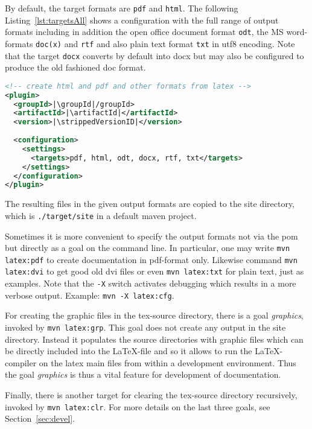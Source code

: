 By default, the target formats are \texttt{pdf} and \texttt{html}. 
The following Listing~\ref{lst:targetsAll} shows a configuration 
with the full range of output formats including in addition 
the open office document format \texttt{odt}, 
the MS word-formats \texttt{doc(x)} and \texttt{rtf} %
and also plain text format \texttt{txt} in utf8 encoding. 
Note that the target \texttt{docx} converts by default into \gls{docx} 
but may also be configured to produce the old fashioned \gls{doc} format. 
%
\begin{lstlisting}[language=xml, basicstyle=\small,
escapechar=|,
float, captionpos=b, label={lst:targetsAll}, 
caption={Configuration with full range output formats}]
<!-- create html and pdf and other formats from latex -->
<plugin>
  <groupId>|\groupId|/groupId>
  <artifactId>|\artifactId|</artifactId>
  <version>|\strippedVersionID|</version>
	
  <configuration>
    <settings>
      <targets>pdf, html, odt, docx, rtf, txt</targets>
    </settings>
  </configuration>
</plugin>
\end{lstlisting}

The resulting files in the given output formats 
are copied to the site directory, 
which is \texttt{./target/site} in a default maven project. 

Sometimes it is more convenient 
to specify the output formats not via the pom 
but directly as a goal on the command line. 
In particular, one may write \texttt{mvn latex:pdf} to create documentation 
in pdf-format only.
Likewise command \texttt{mvn latex:dvi} to get good old dvi files
or even \texttt{mvn latex:txt} for plain text, just as examples. 
Note that the \texttt{-X} switch activates debugging 
which results in a more verbose output. 
Example: \texttt{mvn -X latex:cfg}. 

For creating the graphic files in the tex-source directory, 
there is a goal {\em graphics}, invoked by \texttt{mvn latex:grp}. 
This goal does not create any output in the site directory. 
Instead it populates the source directories 
with graphic files which can be directly included into the \LaTeX-file 
and so it allows to run the \LaTeX-compiler on the latex main files 
from within a development environment. 
Thus the goal {\em graphics\/} is thus a vital feature 
for development of documentation. 


Finally, there is another target for clearing the tex-source directory 
recursively, invoked by \texttt{mvn latex:clr}. 
For more details on the last three goals, see Section~\ref{sec:devel}. 

